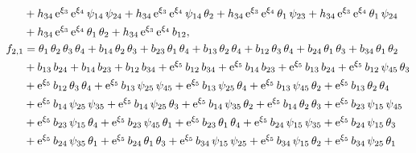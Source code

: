 \documentclass[12pt,a4paper,UTF8]{article}
\numberwithin{equation}{section}
\begin{document}
\begin{equation*}
\begin{aligned}
&+{{h}_{34}}\,{\rm e}^{{{\xi}_{3}}}\,{\rm e}^{{{\xi}_{4}}}\,{{\psi}_{14}}\,{{\psi}_{24}}+{{h}_{34}}\,{\rm e}^{{{\xi}_{3}}}\,{\rm e}^{{{\xi}_{4}}}\,{{\psi}_{14}}\,{{\theta}_{2}}+{{h}_{34}}\,{\rm e}^{{{\xi}_{3}}}\,{\rm e}^{{{\xi}_{4}}}\,{{\theta}_{1}}\,{{\psi}_{23}}+{{h}_{34}}\,{\rm e}^{{{\xi}_{3}}}\,{\rm e}^{{{\xi}_{4}}}\,{{\theta}_{1}}\,{{\psi}_{24}}\\
&+{{h}_{34}}\,{\rm e}^{{{\xi}_{3}}}\,{\rm e}^{{{\xi}_{4}}}\,{{\theta}_{1}}\,{{\theta}_{2}}+{{h}_{34}}\,{\rm e}^{{{\xi}_{3}}}\,{\rm e}^{{{\xi}_{4}}}\,{{b}_{12}} ,\\ 
f_{2,1}&={{\theta}_{1}}\,{{\theta}_{2}}\,{{\theta}_{3}}\,{{\theta}_{4}}+{{b}_{14}}\,{{\theta}_{2}}\,{{\theta}_{3}}+{{b}_{23}}\,{{\theta}_{1}}\,{{\theta}_{4}}+{{b}_{13}}\,{{\theta}_{2}}\,{{\theta}_{4}}+{{b}_{12}}\,{{\theta}_{3}}\,{{\theta}_{4}}+{{b}_{24}}\,{{\theta}_{1}}\,{{\theta}_{3}}+{{b}_{34}}\,{{\theta}_{1}}\,{{\theta}_{2}}\\
&+{{b}_{13}}\,{{b}_{24}}+{{b}_{14}}\,{{b}_{23}}+{{b}_{12}}\,{{b}_{34}}+{\rm e}^{{{\xi}_{5}}}\,{{b}_{12}}\,{{b}_{34}}+{\rm e}^{{{\xi}_{5}}}\,{{b}_{14}}\,{{b}_{23}}+{\rm e}^{{{\xi}_{5}}}\,{{b}_{13}}\,{{b}_{24}}+{\rm e}^{{{\xi}_{5}}}\,{{b}_{12}}\,{{\psi}_{45}}\,{{\theta}_{3}}\\
&+{\rm e}^{{{\xi}_{5}}}\,{{b}_{12}}\,{{\theta}_{3}}\,{{\theta}_{4}}+{\rm e}^{{{\xi}_{5}}}\,{{b}_{13}}\,{{\psi}_{25}}\,{{\psi}_{45}}+{\rm e}^{{{\xi}_{5}}}\,{{b}_{13}}\,{{\psi}_{25}}\,{{\theta}_{4}}+{\rm e}^{{{\xi}_{5}}}\,{{b}_{13}}\,{{\psi}_{45}}\,{{\theta}_{2}}+{\rm e}^{{{\xi}_{5}}}\,{{b}_{13}}\,{{\theta}_{2}}\,{{\theta}_{4}}\\
&+{\rm e}^{{{\xi}_{5}}}\,{{b}_{14}}\,{{\psi}_{25}}\,{{\psi}_{35}}+{\rm e}^{{{\xi}_{5}}}\,{{b}_{14}}\,{{\psi}_{25}}\,{{\theta}_{3}}+{\rm e}^{{{\xi}_{5}}}\,{{b}_{14}}\,{{\psi}_{35}}\,{{\theta}_{2}}+{\rm e}^{{{\xi}_{5}}}\,{{b}_{14}}\,{{\theta}_{2}}\,{{\theta}_{3}}+{\rm e}^{{{\xi}_{5}}}\,{{b}_{23}}\,{{\psi}_{15}}\,{{\psi}_{45}}\\
&+{\rm e}^{{{\xi}_{5}}}\,{{b}_{23}}\,{{\psi}_{15}}\,{{\theta}_{4}}+{\rm e}^{{{\xi}_{5}}}\,{{b}_{23}}\,{{\psi}_{45}}\,{{\theta}_{1}}+{\rm e}^{{{\xi}_{5}}}\,{{b}_{23}}\,{{\theta}_{1}}\,{{\theta}_{4}}+{\rm e}^{{{\xi}_{5}}}\,{{b}_{24}}\,{{\psi}_{15}}\,{{\psi}_{35}}+{\rm e}^{{{\xi}_{5}}}\,{{b}_{24}}\,{{\psi}_{15}}\,{{\theta}_{3}}\\
&+{\rm e}^{{{\xi}_{5}}}\,{{b}_{24}}\,{{\psi}_{35}}\,{{\theta}_{1}}+{\rm e}^{{{\xi}_{5}}}\,{{b}_{24}}\,{{\theta}_{1}}\,{{\theta}_{3}}+{\rm e}^{{{\xi}_{5}}}\,{{b}_{34}}\,{{\psi}_{15}}\,{{\psi}_{25}}+{\rm e}^{{{\xi}_{5}}}\,{{b}_{34}}\,{{\psi}_{15}}\,{{\theta}_{2}}+{\rm e}^{{{\xi}_{5}}}\,{{b}_{34}}\,{{\psi}_{25}}\,{{\theta}_{1}}\\

\end{aligned}
\end{equation*}
\end{document}
